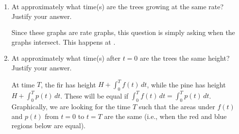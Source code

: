 \documentclass{article}
\begin{document}
\begin{enumerate}
\begin{enumerate}
    \begin{solution}
      The .  The fir's height at the end of 2 years is $H +
      \displaystyle \int_0^2 f(t)\,dt$, while the pine's height at the end
      of 2 years is $H + \displaystyle \int_0^2 p(t)\,dt$.  We can see from
      the graphs that $\displaystyle \int_0^2 p(t)\,dt > \int_0^2 h(t)\,dt$.
    \end{solution}

  \item
    \begin{problem}[\vfill]
      At approximately what time(s) are the trees growing at the same
      rate?  Justify your answer.
    \end{problem}

    \begin{solution}
      Since these graphs are rate graphs, this question is simply asking
      when the graphs intersect.  This happens at .
    \end{solution}

  \item
    \begin{problem}[\vfill\newpage]
      At approximately what time(s) after $t = 0$ are the trees the same
      height?  Justify your answer.
    \end{problem}

    \begin{solution}
      At time $T$, the fir has height $\displaystyle H + \int_0^T
      f(t)\,dt$, while the pine has height $\displaystyle H + \int_0^T
      p(t)\,dt$.  These will be equal if $\displaystyle \int_0^T f(t)\,dt =
      \int_0^T p(t)\,dt$.  Graphically, we are looking for the time $T$
      such that the areas under $f(t)$ and $p(t)$ from $t = 0$ to $t = T$
      are the same (i.e., when the red and blue regions below are equal).

\end{solution}
\end{enumerate}
\end{enumerate}
\end{document}
